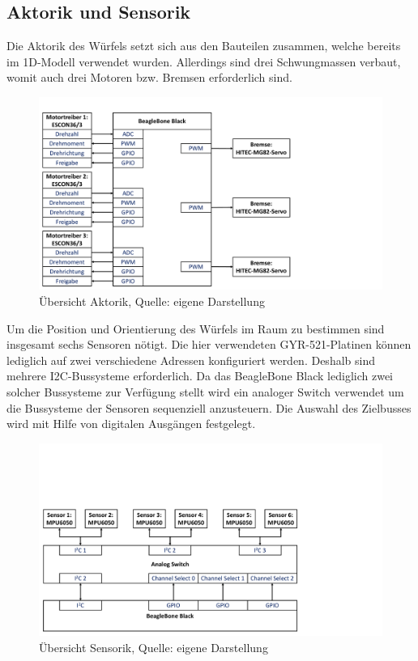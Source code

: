 \subsection{Aktorik und Sensorik}
Die Aktorik des Würfels setzt sich aus den Bauteilen zusammen, welche bereits im 1D-Modell verwendet wurden. Allerdings sind drei Schwungmassen verbaut, womit auch drei Motoren bzw. Bremsen erforderlich sind.

\begin{figure}[!h]
\centering
\includegraphics[width=0.8\linewidth, trim={0cm 0cm 7.5cm 1cm}, clip]{img/3D_AktorikBSB}
\caption{Übersicht Aktorik, Quelle: eigene Darstellung}
\end{figure}

Um die Position und Orientierung des Würfels im Raum zu bestimmen sind insgesamt sechs Sensoren nötigt. Die hier verwendeten GYR-521-Platinen können lediglich auf zwei verschiedene Adressen konfiguriert werden. Deshalb sind mehrere I2C-Bussysteme erforderlich. Da das BeagleBone Black lediglich zwei solcher Bussysteme zur Verfügung stellt wird ein analoger Switch verwendet um die Bussysteme der Sensoren sequenziell anzusteuern. Die Auswahl des Zielbusses wird mit Hilfe von digitalen Ausgängen festgelegt.

\begin{figure}[!h]
\centering
\includegraphics[width=0.8\linewidth, trim={0cm 0cm 8cm 6cm}, clip]{img/3D_SensorikBSB}
\caption{Übersicht Sensorik, Quelle: eigene Darstellung}
\end{figure}
